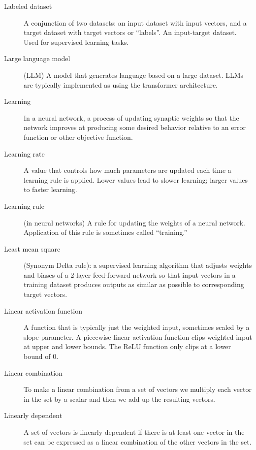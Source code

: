 \begin{description}



\item[Labeled dataset] A conjunction of two datasets: an input dataset with input vectors, and a target dataset with target vectors or ``labels''. An input-target dataset. Used for supervised learning tasks.  

\item[Large language model] (LLM) A model that generates language based on a large dataset.  LLMs are typically implemented as using the transformer architecture.

\item[Learning] In a neural network, a process of updating synaptic weights so that the network improves at producing some desired behavior relative to an error function or other objective function.

\item[Learning rate] A value that controls how much parameters are updated each time a learning rule is applied. Lower values lead to slower learning; larger values to faster learning.

\item[Learning rule] (in neural networks) A rule for updating the weights of a neural network. Application of this rule is sometimes called ``training.''

\item[Least mean square] (Synonym Delta rule): a supervised learning algorithm that adjusts weights and biases of a 2-layer feed-forward network so that input vectors in a training dataset produces outputs as similar as possible to corresponding target vectors.

\item[Linear activation function] A function that is typically just the weighted input, sometimes scaled by a slope parameter. A piecewise linear activation function clips weighted input at  upper and lower bounds. The ReLU function only clips at a lower bound of 0.

\item[Linear combination] To make a linear combination from a set of vectors we multiply each vector in the set by a scalar and then we add up the resulting vectors.

\item[Linearly dependent] A set of vectors is linearly dependent if there is at least one vector in the set can be expressed as a linear combination of the other vectors in the set.


\end{description}
